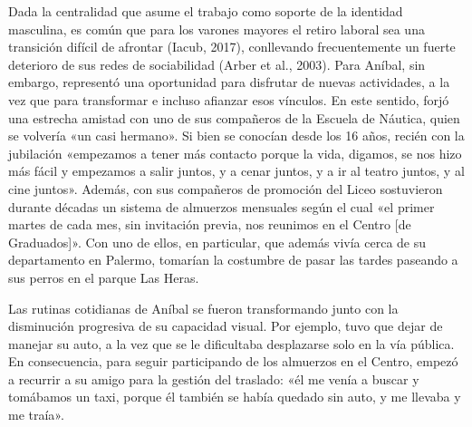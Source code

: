 Dada la centralidad que asume el trabajo como soporte de la identidad masculina, es común que para los varones mayores el retiro laboral sea una transición difícil de afrontar (Iacub, 2017), conllevando frecuentemente un fuerte deterioro de sus redes de sociabilidad (Arber et al., 2003). Para Aníbal, sin embargo, representó una oportunidad para disfrutar de nuevas actividades, a la vez que para transformar e incluso afianzar esos vínculos. En este sentido, forjó una estrecha amistad con uno de sus compañeros de la Escuela de Náutica, quien se volvería «un casi hermano». Si bien se conocían desde los 16 años, recién con la jubilación «empezamos a tener más contacto porque la vida, digamos, se nos hizo más fácil y empezamos a salir juntos, y a cenar juntos, y a ir al teatro juntos, y al cine juntos». Además, con sus compañeros de promoción del Liceo sostuvieron durante décadas un sistema de almuerzos mensuales según el cual «el primer martes de cada mes, sin invitación previa, nos reunimos en el Centro {[}de Graduados{]}». Con uno de ellos, en particular, que además vivía cerca de su departamento en Palermo, tomarían la costumbre de pasar las tardes paseando a sus perros en el parque Las Heras.

Las rutinas cotidianas de Aníbal se fueron transformando junto con la disminución progresiva de su capacidad visual. Por ejemplo, tuvo que dejar de manejar su auto, a la vez que se le dificultaba desplazarse solo en la vía pública. En consecuencia, para seguir participando de los almuerzos en el Centro, empezó a recurrir a su amigo para la gestión del traslado: «él me venía a buscar y tomábamos un taxi, porque él también se había quedado sin auto, y me llevaba y me traía».

